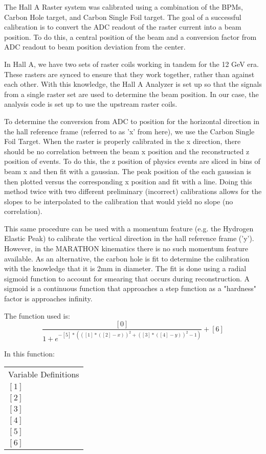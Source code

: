 The Hall A Raster system was calibrated using a combination of the BPMs, Carbon Hole target, and Carbon Single Foil target. The goal of a successful calibration is to convert the ADC readout of the raster current into a beam position. To do this, a central position of the beam and a conversion factor from ADC readout to beam position deviation from the center.

In Hall A, we have two sets of raster coils working in tandem for the 12 GeV era. These rasters are synced to ensure that they work together, rather than against each other. With this knowledge, the Hall A Analyzer is set up so that the signals from a single raster set are used to determine the beam position. In our case, the analysis code is set up to use the upstream raster coils.

To determine the conversion from ADC to position for the horizontal direction in the hall reference frame (referred to as 'x' from here), we use the Carbon Single Foil Target. When the raster is properly calibrated in the x direction, there should be no correlation between the beam x position and the reconstructed z position of events. To do this, the z position of physics events are sliced in bins of beam x and then fit with a gaussian. The peak position of the each gaussian is then plotted versus the corresponding x position and fit with a line. Doing this method twice with two different preliminary (incorrect) calibrations allows for the slopes to be interpolated to the calibration that would yield no slope (no correlation).

This same procedure can be used with a momentum feature (e.g. the Hydrogen Elastic Peak) to calibrate the vertical direction in the hall reference frame ('y'). However, in the MARATHON kinematics there is no such momentum feature available. As an alternative, the carbon hole is fit to determine the calibration with the knowledge that it is 2mm in diameter. The fit is done using a radial sigmoid function to account for smearing that occurs during reconstruction. A sigmoid is a continuous function that approaches a step function as a "hardness" factor is approaches infinity.

The function used is:
\begin{equation}
\frac{[0]}{1+e^{-[5]*\left(\left([1]*\left([2]-x\right)\right)^{2}+\left([3]*\left([4]-y\right)\right)^{2}-1\right)}}+[6]
\end{equation}

In this function:
\begin{tabular}{l|l}
	\multicolumn{2}{l}{Variable Definitions}
	\hline
	$[0]$ & \\
	$[1]$ & \\
	$[2]$ & \\
	$[3]$ & \\
	$[4]$ & \\
	$[5]$ & \\
	$[6]$ & \\
\end{tabular}

